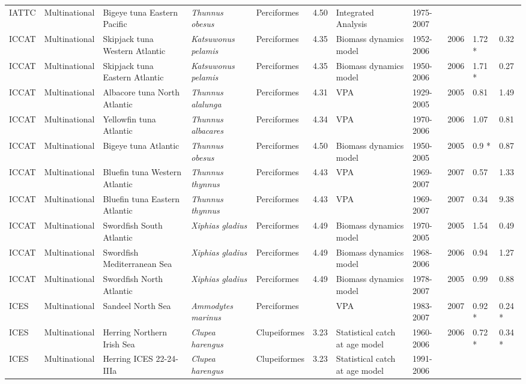 \begin{longtable}{p{1.5cm}p{1.5cm}p{3cm}p{3cm}p{2.5cm}p{0.9cm}p{1.4cm}p{0.9cm}p{0.9cm}p{0.9cm}p{1cm}}
  IATTC & Multinational & Bigeye tuna Eastern Pacific & \textit{Thunnus obesus} & Perciformes & 4.50 & Integrated Analysis & 1975-2007 &  &  &  \\ 
  ICCAT & Multinational & Skipjack tuna Western Atlantic & \textit{Katsuwonus pelamis} & Perciformes & 4.35 & Biomass dynamics model & 1952-2006 & 2006 & 1.72 * & 0.32 \\ 
  ICCAT & Multinational & Skipjack tuna Eastern Atlantic & \textit{Katsuwonus pelamis} & Perciformes & 4.35 & Biomass dynamics model & 1950-2006 & 2006 & 1.71 * & 0.27 \\ 
  ICCAT & Multinational & Albacore tuna North Atlantic & \textit{Thunnus alalunga} & Perciformes & 4.31 & VPA & 1929-2005 & 2005 & 0.81 & 1.49 \\ 
  ICCAT & Multinational & Yellowfin tuna Atlantic & \textit{Thunnus albacares} & Perciformes & 4.34 & VPA & 1970-2006 & 2006 & 1.07 & 0.81 \\ 
  ICCAT & Multinational & Bigeye tuna Atlantic & \textit{Thunnus obesus} & Perciformes & 4.50 & Biomass dynamics model & 1950-2005 & 2005 & 0.9 * & 0.87 \\ 
  ICCAT & Multinational & Bluefin tuna Western Atlantic & \textit{Thunnus thynnus} & Perciformes & 4.43 & VPA & 1969-2007 & 2007 & 0.57 & 1.33 \\ 
  ICCAT & Multinational & Bluefin tuna Eastern Atlantic & \textit{Thunnus thynnus} & Perciformes & 4.43 & VPA & 1969-2007 & 2007 & 0.34 & 9.38 \\ 
  ICCAT & Multinational & Swordfish South Atlantic & \textit{Xiphias gladius} & Perciformes & 4.49 & Biomass dynamics model & 1970-2005 & 2005 & 1.54 & 0.49 \\ 
  ICCAT & Multinational & Swordfish Mediterranean Sea & \textit{Xiphias gladius} & Perciformes & 4.49 & Biomass dynamics model & 1968-2006 & 2006 & 0.94 & 1.27 \\ 
  ICCAT & Multinational & Swordfish North Atlantic & \textit{Xiphias gladius} & Perciformes & 4.49 & Biomass dynamics model & 1978-2007 & 2005 & 0.99 & 0.88 \\ 
  ICES & Multinational & Sandeel North Sea & \textit{Ammodytes marinus} & Perciformes &  & VPA & 1983-2007 & 2007 & 0.92 * & 0.24 * \\ 
  ICES & Multinational & Herring Northern Irish Sea & \textit{Clupea harengus} & Clupeiformes & 3.23 & Statistical catch at age model & 1960-2006 & 2006 & 0.72 * & 0.34 * \\ 
  ICES & Multinational & Herring ICES 22-24-IIIa & \textit{Clupea harengus} & Clupeiformes & 3.23 & Statistical catch at age model & 1991-2006 &  &  &  \\ 

\end{longtable}
